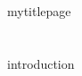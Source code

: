 \documentclass[11pt]{article} %
\begin{document}
{mytitlepage}


\singlespacing %
\renewcommand\contentsname{Table of Contents}
\tableofcontents{}
\doublespacing
\newpage



\ifdefined\Introduction
    \section*{\Introduction}
    \label{intro}
    {introduction}
\fi
\end{document}
